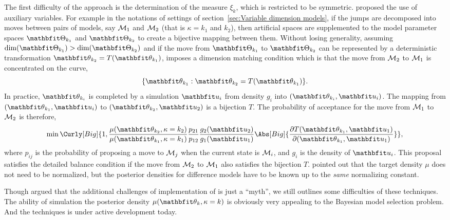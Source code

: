 The first difficulty of the \rjmcmc approach is the determination of the
measure $\xi_k$, which is restricted to be symmetric. \textcite{Green:1995dg}
proposed the use of auxiliary variables. For example in the notations of
settings of section~\ref{sec:Variable dimension models}, if the jumps are
decomposed into moves between pairs of models, say $\mathcal{M}_1$ and $\mathcal{M}_2$
(that is $\kappa = k_1$ and $k_2$), then artificial spaces are supplemented to
the model parameter spaces $\bTh_{k_1}$ and $\bTh_{k_2}$ to create a bijective
mapping between them. Without losing generality, assuming $\dim(\bTh_{k_1}) >
\dim(\bTh_{k_2})$ and if the move from $\bTh_{k_1}$ to $\bTh_{k_2}$ can be
represented by a deterministic transformation $\bth_{k_2}= T(\bth_{k_1})$,
\textcite{Green:1995dg} imposes a dimension matching condition which is that
the move from $\mathcal{M}_2$ to $\mathcal{M}_1$ is concentrated on the curve,
\begin{equation}
  \{\bth_{k_1}:\bth_{k_2}= T(\bth_{k_1})\}.
\end{equation}
In practice, $\bth_{k_i}$ is completed by a simulation $\bfu_i$ from density
$g_i$ into $(\bth_{k_i},\bfu_i)$. The mapping from $(\bth_{k_1},\bfu_i)$ to
$(\bth_{k_2},\bfu_2)$ is a bijection $T$. The probability of acceptance for
the move from $\mathcal{M}_1$ to $\mathcal{M}_2$ is therefore,
\begin{equation}
  \min\Curly[Big]{1,
    \frac{\mu(\bth_{k_2},\kappa = k_2)}{\mu(\bth_{k_1},\kappa = k_1)}
    \frac{p_{21}}{p_{12}} \frac{g_2(\bfu_2)}{g_1(\bfu_1)}
    \Abs[Big]{
      \frac{\partial T(\bth_{k_1},\bfu_1)}{\partial (\bth_{k_1},\bfu_1)}}},
\end{equation}
where $p_{ij}$ is the probability of proposing a move to $\mathcal{M}_j$ when the
current state is $\mathcal{M}_i$, and $g_i$ is the density of $\bfu_i$. This
proposal satisfies the detailed balance condition if the move from $\mathcal{M}_2$
to $\mathcal{M}_1$ also satisfies the bijection $T$. \textcite{Green:1995dg} pointed
out that the target density $\mu$ does not need to be normalized, but the
posterior densities for difference models have to be known up to the
\emph{same} normalizing constant.

Though \textcite{Green:2009tr} argued that the additional challenges of
implementation of \rjmcmc is just a ``myth'', we still outlines some
difficulties of these techniques. The ability of simulation the posterior
density $\mu(\bth_k,\kappa = k)$ is obviously very appealing to the Bayesian
model selection problem. And the \rjmcmc techniques is under active
development today.

